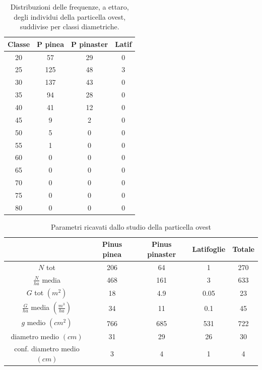 \begin{table}[H]
\caption{Distribuzioni delle frequenze, a ettaro, degli individui della particella ovest, suddivise per classi diametriche.}
\centering
\begin{tabular}{cccc}
\toprule
Classe & P pinea & P pinaster & Latif \\
\midrule
20     & 57      & 29         & 0     \\
25     & 125     & 48         & 3     \\
30     & 137     & 43         & 0     \\
35     & 94      & 28         & 0     \\
40     & 41      & 12         & 0     \\
45     & 9       & 2          & 0     \\
50     & 5       & 0          & 0     \\
55     & 1       & 0          & 0     \\
60     & 0       & 0          & 0     \\
65     & 0       & 0          & 0     \\
70     & 0       & 0          & 0     \\
75     & 0       & 0          & 0     \\
80     & 0       & 0          & 0    \\
\bottomrule
\end{tabular}
\label{tab:tab_freq_rel_ovest}
\end{table}

\begin{table}[H]
  \caption{Parametri ricavati dallo studio della particella ovest}
    \centering
     \begin{tabular}{ccccc}
     \toprule
       & Pinus pinea & Pinus pinaster &  Latifoglie & Totale  \\
       \midrule
        $N$ tot & 206 & 64 & 1 & 270\\
        $\frac{N}{ha}$ media & 468 & 161 & 3 & 633\\
         $G$ tot $(m^2)$ & 18 & 4.9 & 0.05 & 23 \\
        $\frac{G}{ha}$ media $(\frac{m^3}{ha})$ & 34 & 11 & 0.1 & 45\\
        $g$ medio $(cm^2)$ & 766 & 685 & 531 & 722\\
        diametro medio  $(cm)$ & 31 & 29 & 26 & 30\\
        conf. diametro medio $(cm)$ & 3 & 4 & 1 & 4 \\
       \bottomrule
        \end{tabular}
    \label{tab:tab_relascopica_ovest}
\end{table}

